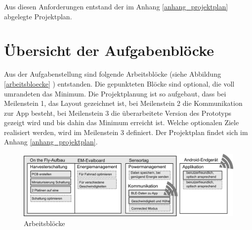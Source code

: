 Aus diesen Anforderungen entstand der im Anhang \ref{anhang_projektplan} abgelegte Projektplan. 






\section{Übersicht der Aufgabenblöcke}
Aus der Aufgabenstellung sind folgende Arbeitsblöcke (siehe Abbildung \ref{arbeitsbloecke} ) entstanden. Die gepunkteten Blöcke sind optional, die voll umrandeten das Minimum. Die Projektplanung ist so aufgebaut, dass bei Meilenstein 1, das Layout gezeichnet ist, bei Meilenstein 2 die Kommunikation zur App besteht, bei Meilenstein 3 die überarbeitete Version des Prototyps gezeigt wird und bis dahin das Minimum erreicht ist. Welche optionalen Ziele realisiert werden, wird im Meilenstein 3 definiert. Der Projektplan findet sich im Anhang \ref{anhang_projektplan}.

\begin{figure}[h]
    \includegraphics[scale=0.5]{../ressources/Projektorganisation/Arbeitsbloecke.png} 
    \caption{Arbeitsblöcke}
\end{figure}\label{arbeitsbloecke} 

